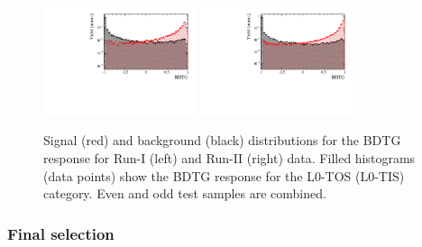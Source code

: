 \begin{figure}[h]
\centering
\includegraphics[height=!,width=0.4\textwidth]{figs/TMVA/BDTG_Run1.pdf}
\includegraphics[height=!,width=0.4\textwidth]{figs/TMVA/BDTG_Run2.pdf}
\caption{Signal (red) and background (black) distributions for the BDTG response for Run-I (left) and Run-II (right) data. 
Filled histograms (data points) show the BDTG response for the \textsf{L0-TOS} (\textsf{L0-TIS}) category.
Even and odd test samples are combined.
}
\label{fig:BDTG}
\end{figure}

\subsubsection{Final selection}

